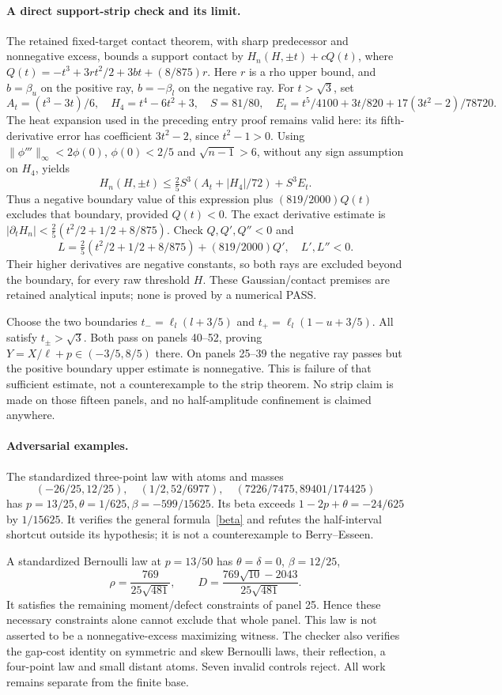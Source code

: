 \documentclass[10pt]{article}
\begin{document}
\paragraph{A direct support-strip check and its limit.}
The retained fixed-target contact theorem, with sharp predecessor and
nonnegative excess, bounds a support contact by \(H_n(H,\pm t)+cQ(t)\),
where
\(Q(t)=-t^3+3rt^2/2+3bt+(8/875)r\).
Here \(r\) is a rho upper bound, and \(b=\beta_u\) on the positive ray,
\(b=-\beta_l\) on the negative ray.
For \(t>\sqrt3\), set
\[
 A_t=(t^3-3t)/6,\quad H_4=t^4-6t^2+3,\quad S=81/80,
\quad E_t=t^5/4100+3t/820+17(3t^2-2)/78720.
\]
The heat expansion used in the preceding entry proof remains valid here:
its fifth-derivative error has coefficient \(3t^2-2\), since \(t^2-1>0\).
Using \(\|\phi'''\|_\infty<2\phi(0)\), \(\phi(0)<2/5\) and
\(\sqrt{n-1}>6\), without any sign assumption on \(H_4\), yields
\[
 H_n(H,\pm t)\le \tfrac25S^3(A_t+|H_4|/72)+S^3E_t.
\]
Thus a negative boundary value of this expression plus
\((819/2000)Q(t)\) excludes that boundary, provided \(Q(t)<0\).
The exact derivative estimate is
\(|\partial_tH_n|<\tfrac25(t^2/2+1/2+8/875)\).
Check \(Q,Q',Q''<0\) and
\[
 L=\tfrac25(t^2/2+1/2+8/875)+(819/2000)Q',\quad L',L''<0.
\]
Their higher derivatives are negative constants, so both rays are excluded
beyond the boundary, for every raw threshold \(H\).
These Gaussian/contact premises are retained analytical inputs; none is
proved by a numerical PASS.

Choose the two boundaries
\(t_-=\ell_l(l+3/5)\) and \(t_+=\ell_l(1-u+3/5)\).
All satisfy \(t_\pm>\sqrt3\). Both pass on panels 40--52, proving
\(Y=X/\ell+p\in(-3/5,8/5)\) there.
On panels 25--39 the negative ray passes but the positive boundary
upper estimate is nonnegative. This is failure of that sufficient estimate,
not a counterexample to the strip theorem. No strip claim is made on those
fifteen panels, and no half-amplitude confinement is claimed anywhere.

\paragraph{Adversarial examples.}
The standardized three-point law with atoms and masses
\[
 (-26/25,12/25),\quad(1/2,52/6977),\quad
 (7226/7475,89401/174425)
\]
has \(p=13/25,\theta=1/625,\beta=-599/15625\).
Its beta exceeds \(1-2p+\theta=-24/625\) by \(1/15625\).
It verifies the general formula~\eqref{beta} and refutes the half-interval
shortcut outside its hypothesis; it is not a counterexample to Berry--Esseen.

A standardized Bernoulli law at \(p=13/50\) has
\(\theta=\delta=0\), \(\beta=12/25\),
\[
 \rho=\frac{769}{25\sqrt{481}},\qquad
 D=\frac{769\sqrt{10}-2043}{25\sqrt{481}}.
\]
It satisfies the remaining moment/defect constraints of panel 25.
Hence these necessary constraints alone cannot exclude that whole panel.
This law is not asserted to be a nonnegative-excess maximizing witness.
The checker also verifies the gap-cost identity on symmetric and skew
Bernoulli laws, their reflection, a four-point law and small distant atoms.
Seven invalid controls reject. All work remains separate from the finite base.
\end{document}
